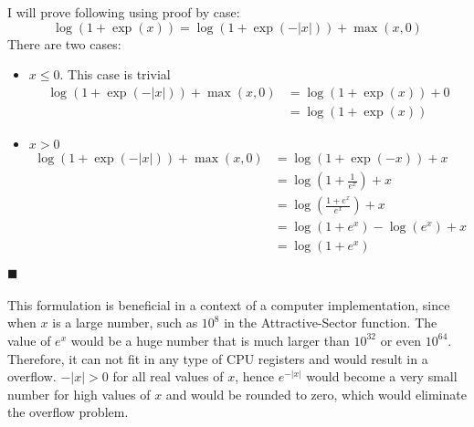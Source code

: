 \documentclass[a4paper]{article}
\newcommand*{\QEDA}{\hfill\ensuremath{\blacksquare}}%
\begin{document}
\section{}
\label{t5}
I will prove following using proof by case:
\[
\log (1+\exp (x))=\log (1+\exp (-|x|))+\max (x, 0)
\]
There are two cases:
\begin{itemize}
\item $x \leq 0$. This case is trivial
  \begin{align*}
    \log (1+\exp (-|x|))+\max (x, 0) &= \log (1+\exp (x)) + 0\\
    &= \log (1+\exp(x))
  \end{align*}
\item $x > 0$
  \begin{align*}
    \log (1+\exp (-|x|))+\max (x, 0) &= \log (1+\exp (-x)) + x\\
    &=\log \left(1 + \frac{1}{e^{x}}\right) + x\\
    &=\log \left(\frac{1 + e^{x}}{e^{x}}\right) + x\\
    &=\log (1 + e^{x}) - \log \left(e^{x}\right) + x\\
    &=\log (1 + e^{x})
  \end{align*}
\end{itemize}
\QEDA\\\\
This formulation is beneficial in a context of a computer implementation, since
when $x$ is a large number, such as $10^8$ in the Attractive-Sector function.
The value of $e^{x}$ would be a huge number that is much larger than
$10^{32}$ or even $10^{64}$. Therefore, it can not fit in any type of CPU
registers and would result in a overflow. $-|x| > 0$ for all real values of $x$,
hence $e^{-|x|}$ would become a very small number for high values of $x$ and
would be rounded to zero, which would eliminate the overflow problem.



\end{document}
